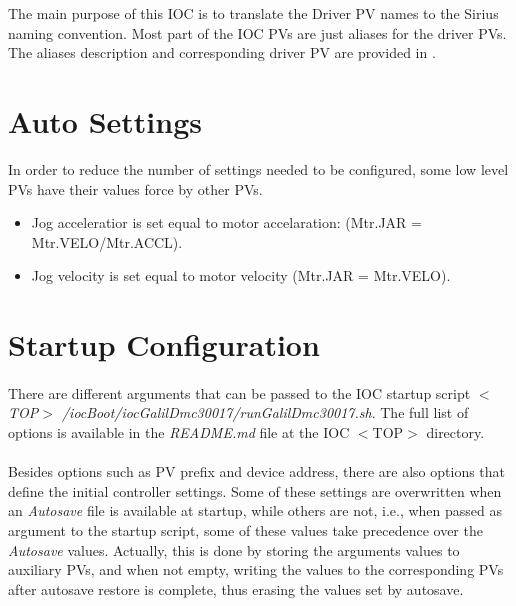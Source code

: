 \documentclass[openany]{article}
\begin{document}
    The main purpose of this IOC is to translate the Driver PV names to the Sirius naming convention. Most part of the IOC PVs are just aliases for the driver PVs. The aliases description and corresponding driver PV are provided in .

\section{Auto Settings}

    In order to reduce the number of settings needed to be configured, some low level PVs have their values force by other PVs.

    \begin{itemize}
        \item Jog acceleratior is set equal to motor accelaration: (Mtr.JAR = Mtr.VELO/Mtr.ACCL).
        \item Jog velocity is set equal to motor velocity (Mtr.JAR = Mtr.VELO).
    \end{itemize}

\section{Startup Configuration}

    \paragraph{} There are different arguments that can be passed to the IOC startup script \emph{$<$TOP$>$ /iocBoot/iocGalilDmc30017/runGalilDmc30017.sh}. The full list of options is available in the \emph{README.md} file at the IOC $<$TOP$>$ directory.

    \paragraph{} Besides options such as PV prefix and device address, there are also options that define the initial controller settings. Some of these settings are overwritten when an \emph{Autosave} file is available at startup, while others are not, i.e., when passed as argument to the startup script, some of these values take precedence over the \emph{Autosave} values. Actually, this is done by storing the arguments values to auxiliary PVs, and when not empty, writing the values to the corresponding PVs after autosave restore is complete, thus erasing the values set by autosave.
\end{document}

